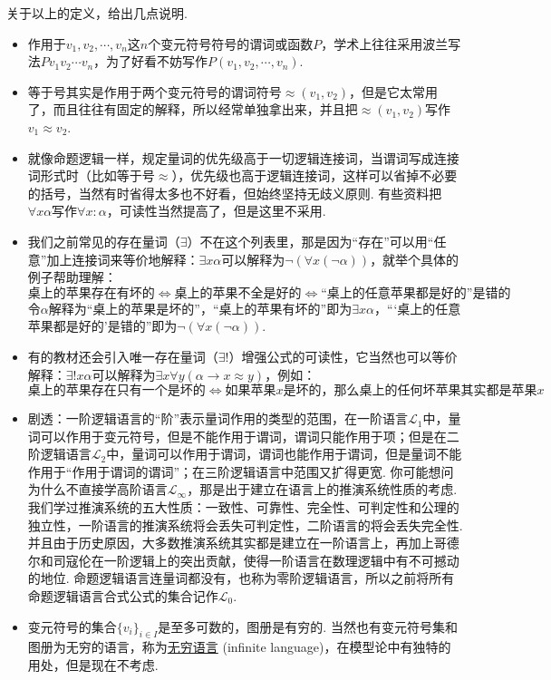 关于以上的定义，给出几点说明.
\begin{itemize}
    \item 作用于\(v_1, v_2, \cdots, v_n\)这\(n\)个变元符号符号的谓词或函数\(P\)，学术上往往采用波兰写法\(Pv_1v_2\cdots v_n\)，为了好看不妨写作\(P(v_1,v_2,\cdots,v_n)\).
    \item 等于号其实是作用于两个变元符号的谓词符号\(\approx(v_1,v_2)\)，但是它太常用了，而且往往有固定的解释，所以经常单独拿出来，并且把\(\approx(v_1,v_2)\)写作\(v_1 \approx v_2\). 
    \item 就像命题逻辑一样，规定量词的优先级高于一切逻辑连接词，当谓词写成连接词形式时（比如等于号\(\approx\)），优先级也高于逻辑连接词，这样可以省掉不必要的括号，当然有时省得太多也不好看，但始终坚持无歧义原则. 有些资料把\(\forall x \alpha\)写作\(\forall x: \alpha\)，可读性当然提高了，但是这里不采用.
    \item 我们之前常见的存在量词（\(\exists\)）不在这个列表里，那是因为“存在”可以用“任意”加上连接词来等价地解释：\(\exists x \alpha\)可以解释为\(\neg(\forall x (\neg\alpha))\)，就举个具体的例子帮助理解：
    \[\mbox{桌上的苹果存在有坏的} \Leftrightarrow \mbox{桌上的苹果不全是好的} \Leftrightarrow \mbox{“桌上的任意苹果都是好的”是错的}\]
    令\(\alpha\)解释为“桌上的苹果是坏的”，“桌上的苹果有坏的”即为\(\exists x \alpha\)，“‘桌上的任意苹果都是好的’是错的”即为\(\neg(\forall x (\neg\alpha))\).
    \item 有的教材还会引入唯一存在量词（\(\exists!\)）增强公式的可读性，它当然也可以等价解释：\(\exists! x \alpha\)可以解释为\(\exists x \forall y(\alpha \to x \approx y)\)，例如：
    \[\mbox{桌上的苹果存在只有一个是坏的} \Leftrightarrow \mbox{如果苹果}x\mbox{是坏的，那么桌上的任何坏苹果其实都是苹果}x \]
    \item 剧透：一阶逻辑语言的“阶”表示量词作用的类型的范围，在一阶语言\(\mathcal{L}_1\)中，量词可以作用于变元符号，但是不能作用于谓词，谓词只能作用于项；但是在二阶逻辑语言\(\mathcal{L}_2\)中，量词可以作用于谓词，谓词也能作用于谓词，但是量词不能作用于“作用于谓词的谓词”；在三阶逻辑语言中范围又扩得更宽. 你可能想问为什么不直接学高阶语言\(\mathcal{L}_\infty\)，那是出于建立在语言上的推演系统性质的考虑. 我们学过推演系统的五大性质：一致性、可靠性、完全性、可判定性和公理的独立性，一阶语言的推演系统将会丢失可判定性，二阶语言的将会丢失完全性. 并且由于历史原因，大多数推演系统其实都是建立在一阶语言上，再加上哥德尔和司寇伦在一阶逻辑上的突出贡献，使得一阶语言在数理逻辑中有不可撼动的地位. 命题逻辑语言连量词都没有，也称为零阶逻辑语言，所以之前将所有命题逻辑语言合式公式的集合记作\(\mathcal{L}_0\).
    \item 变元符号的集合\(\{v_i\}_{i \in I}\)是至多可数的，图册是有穷的. 当然也有变元符号集和图册为无穷的语言，称为\underline{无穷语言} (infinite language)，在模型论中有独特的用处，但是现在不考虑.

\end{itemize}
